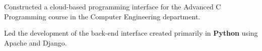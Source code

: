 \documentclass[letterpaper]{deedy-resume} %
\begin{document}
\begin{minipage}[t]{0.66\textwidth}
\begin{tightitemize}
\item Constructed a cloud-based programming interface for the Advanced C Programming course in the Computer Engineering department.
\item Led the development of the back-end interface created primarily in \textbf{Python} using Apache and Django.
\end{tightitemize}

\sectionspace %




\sectionspace %


\end{minipage} %
\end{document}
